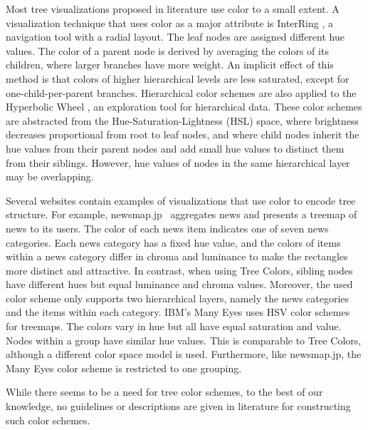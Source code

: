 \documentclass[journal]{vgtc}                %
\begin{document}
Most tree visualizations proposed in literature \cite{schulz2011} use color to a small extent. A visualization technique that uses color as a major attribute is InterRing \cite{yang2002}, a navigation tool with a radial layout. The leaf nodes are assigned different hue values. The color of a parent node is derived by averaging the colors of its children, where larger branches have more weight. An implicit effect of this method is that colors of higher hierarchical levels are less saturated, except for one-child-per-parent branches. 
Hierarchical color schemes are also applied to the Hyperbolic Wheel \cite{lam2012}, an exploration tool for hierarchical data.  These color schemes are abstracted from the Hue-Saturation-Lightness (HSL) space, where brightness decreases proportional from root to leaf nodes, and where child nodes inherit the hue values from their parent nodes and add small hue values to distinct them from their siblings. However, hue values of nodes in the same hierarchical layer may be overlapping.

Several websites contain examples of visualizations that use color to encode tree structure. For example, newsmap.jp~\cite{newsmap} aggregates news and presents a treemap of news to its users. 
The color of each news item indicates one of seven news categories. Each news category has a fixed hue value, and the colors of items within a news category differ in chroma and luminance to make the rectangles more distinct and attractive. In contrast, when using Tree Colors, sibling nodes have different hues but equal luminance and chroma values. Moreover, the used color scheme only supports two hierarchical layers, namely the news categories and the items within each category.
IBM's Many Eyes \cite{manyeyes} uses HSV color schemes for treemaps. The colors vary in hue but all have equal saturation and value. Nodes within a group have similar hue values. This is comparable to Tree Colors, although a different color space model is used. Furthermore, like newsmap.jp, the Many Eyes color scheme is restricted to one grouping.

While there seems to be a need for tree color schemes, to the best of our knowledge, no guidelines or 
descriptions are given in literature for constructing such color schemes.
\end{document}
